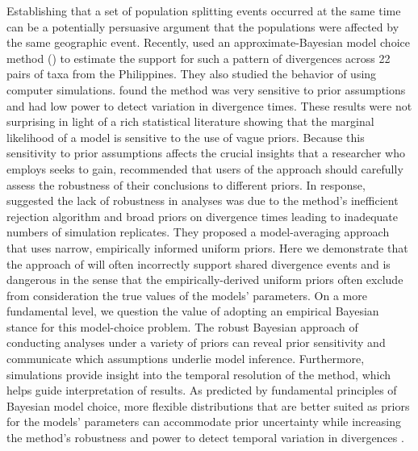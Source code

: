 Establishing that a set of population splitting events occurred at the same
time can be a potentially persuasive argument that the populations were
affected by the same geographic event.
Recently, \citet{Oaks2012} used an approximate-Bayesian model choice method
(\msb) to estimate the support for such a pattern of divergences across 22
pairs of taxa from the Philippines.
They also studied the behavior of \msb using computer simulations.
\citet{Oaks2012} found the method was very sensitive to prior assumptions and
had low power to detect variation in divergence times.
These results were not surprising in light of a rich statistical literature
showing that the marginal likelihood of a model is sensitive to the
use of vague priors.
Because this sensitivity to prior assumptions affects the crucial insights that
a researcher who employs \msb seeks to gain, \citet{Oaks2012} recommended that
users of the approach should carefully assess the robustness of their
conclusions to different priors.
In response, \citet{Hickerson2013} suggested the lack of robustness in \msb
analyses was due to the method's inefficient rejection algorithm and broad
priors on divergence times leading to inadequate numbers of simulation
replicates.
They proposed a model-averaging approach that uses narrow, empirically
informed uniform priors.
Here we demonstrate that the approach of \citet{Hickerson2013} will often
incorrectly support shared divergence events and is dangerous in the sense that
the empirically-derived uniform priors often exclude from consideration the
true values of the models' parameters.
On a more fundamental level, we question the value of adopting an empirical
Bayesian stance for this model-choice problem.
The robust Bayesian approach of conducting analyses under a variety of priors
can reveal prior sensitivity and communicate which assumptions underlie model
inference.
Furthermore, simulations provide insight into the temporal resolution of the
method, which helps guide interpretation of results.
As predicted by fundamental principles of Bayesian model choice, more flexible
distributions that are better suited as priors for the models' parameters can
accommodate prior uncertainty while increasing the method's robustness and
power to detect temporal variation in divergences
\citep{Oaks2014dpp}.
